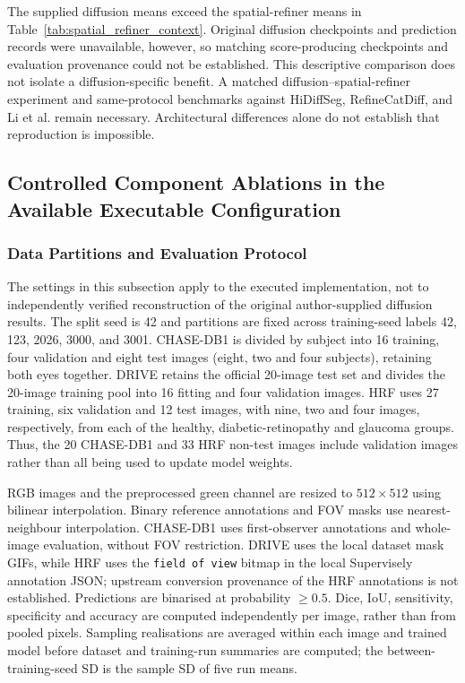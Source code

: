 \documentclass[jimaging,article,submit,pdftex,moreauthors]{Definitions/mdpi}%
\begin{document}
The supplied diffusion means exceed the spatial-refiner means in Table~\ref{tab:spatial_refiner_context}. Original diffusion checkpoints and prediction records were unavailable, however, so matching score-producing checkpoints and evaluation provenance could not be established. This descriptive comparison does not isolate a diffusion-specific benefit. A matched diffusion--spatial-refiner experiment and same-protocol benchmarks against HiDiffSeg, RefineCatDiff, and Li et al. remain necessary. Architectural differences alone do not establish that reproduction is impossible.




\subsection{Controlled Component Ablations in the Available Executable Configuration}
\label{sec:component_ablations}

\subsubsection{Data Partitions and Evaluation Protocol}
\label{sec:new_run_evaluation}

The settings in this subsection apply to the executed implementation, not to independently verified reconstruction of the original author-supplied diffusion results. The split seed is 42 and partitions are fixed across training-seed labels 42, 123, 2026, 3000, and 3001. CHASE-DB1 is divided by subject into 16 training, four validation and eight test images (eight, two and four subjects), retaining both eyes together. DRIVE retains the official 20-image test set and divides the 20-image training pool into 16 fitting and four validation images. HRF uses 27 training, six validation and 12 test images, with nine, two and four images, respectively, from each of the healthy, diabetic-retinopathy and glaucoma groups. Thus, the 20 CHASE-DB1 and 33 HRF non-test images include validation images rather than all being used to update model weights.

RGB images and the preprocessed green channel are resized to $512\times512$ using bilinear interpolation. Binary reference annotations and FOV masks use nearest-neighbour interpolation. CHASE-DB1 uses first-observer annotations and whole-image evaluation, without FOV restriction. DRIVE uses the local dataset mask GIFs, while HRF uses the \texttt{field of view} bitmap in the local Supervisely annotation JSON; upstream conversion provenance of the HRF annotations is not established. Predictions are binarised at probability $\geq0.5$. Dice, IoU, sensitivity, specificity and accuracy are computed independently per image, rather than from pooled pixels. Sampling realisations are averaged within each image and trained model before dataset and training-run summaries are computed; the between-training-seed SD is the sample SD of five run means.
\end{document}
